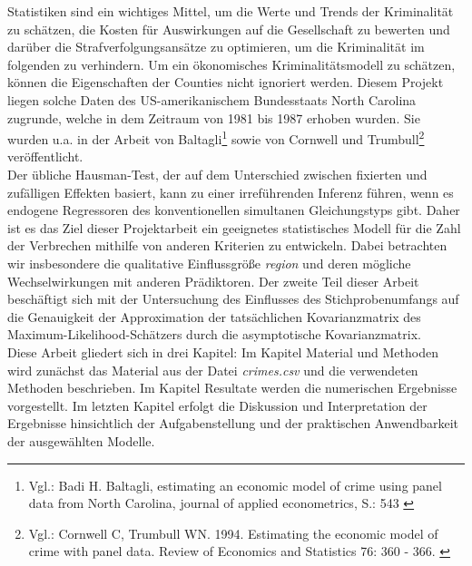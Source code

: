 Statistiken sind ein wichtiges Mittel, um die Werte und Trends der Kriminalit\"at zu sch\"atzen, die Kosten f\"ur Auswirkungen auf die Gesellschaft zu bewerten und dar\"uber die Strafverfolgungsans\"atze zu optimieren, um die Kriminalit\"at im folgenden zu verhindern. 
Um ein \"okonomisches Kriminalit\"atsmodell zu sch\"atzen, k\"onnen die Eigenschaften der Counties nicht ignoriert werden. Diesem Projekt liegen solche Daten des US-amerikanischem Bundesstaats North Carolina zugrunde, welche in dem Zeitraum von 1981 bis 1987 erhoben wurden. Sie wurden u.a. in der Arbeit von Baltagli\footnote{Vgl.: Badi H. Baltagli, estimating an economic model of crime using panel data from North Carolina, journal of applied econometrics, S.: 543 \label{ftn:bal}} sowie von Cornwell und Trumbull\footnote{Vgl.: Cornwell C, Trumbull WN. 1994. Estimating the economic model of crime with panel data. Review of
Economics and Statistics 76: 360 - 366. \label{ftn:cut}} ver\"offentlicht. \\
 
Der \"ubliche Hausman-Test, der auf dem Unterschied zwischen fixierten und zuf\"alligen Effekten basiert, kann zu einer irref\"uhrenden Inferenz f\"uhren, wenn es endogene Regressoren des konventionellen simultanen Gleichungstyps gibt.
Daher ist es das Ziel dieser Projektarbeit ein geeignetes statistisches Modell f\"ur die Zahl der Verbrechen mithilfe von anderen Kriterien zu entwickeln. Dabei betrachten wir insbesondere die qualitative Einflussgr\"o\ss{}e \textit{region} und deren m\"ogliche Wechselwirkungen mit anderen Pr\"adiktoren. 
Der zweite Teil dieser Arbeit besch\"aftigt sich mit der Untersuchung des Einflusses des Stichprobenumfangs auf die Genauigkeit der Approximation der tats\"achlichen Kovarianzmatrix des Maximum-Likelihood-Sch\"atzers durch die asymptotische Kovarianzmatrix. \\

Diese Arbeit gliedert sich in drei Kapitel: Im Kapitel Material und Methoden wird zun\"achst das Material aus der Datei \textit{crimes.csv} und die verwendeten Methoden beschrieben. Im Kapitel Resultate werden die numerischen Ergebnisse vorgestellt. Im letzten Kapitel erfolgt die Diskussion und Interpretation der Ergebnisse hinsichtlich der Aufgabenstellung und der praktischen Anwendbarkeit der ausgew\"ahlten Modelle.